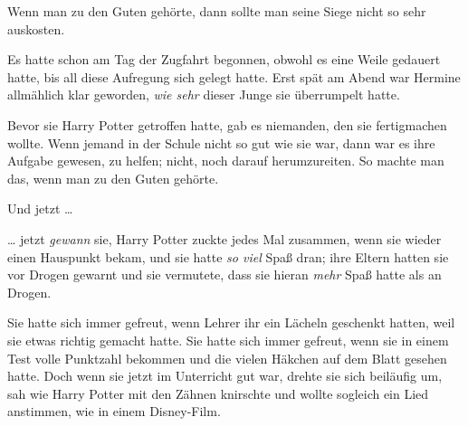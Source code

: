 Wenn man zu den Guten gehörte, dann sollte man seine Siege nicht so sehr auskosten.

Es hatte schon am Tag der Zugfahrt begonnen, obwohl es eine Weile gedauert hatte, bis all diese Aufregung sich gelegt hatte. Erst spät am Abend war Hermine allmählich klar geworden, \emph{wie sehr} dieser Junge sie überrumpelt hatte.

Bevor sie Harry Potter getroffen hatte, gab es niemanden, den sie fertigmachen wollte. Wenn jemand in der Schule nicht so gut wie sie war, dann war es ihre Aufgabe gewesen, zu helfen; nicht, noch darauf herumzureiten. So machte man das, wenn man zu den Guten gehörte.

Und jetzt …

… jetzt \emph{gewann} sie, Harry Potter zuckte jedes Mal zusammen, wenn sie wieder einen Hauspunkt bekam, und sie hatte \emph{so viel} Spaß dran; ihre Eltern hatten sie vor Drogen gewarnt und sie vermutete, dass sie hieran \emph{mehr} Spaß hatte als an Drogen.

Sie hatte sich immer gefreut, wenn Lehrer ihr ein Lächeln geschenkt hatten, weil sie etwas richtig gemacht hatte. Sie hatte sich immer gefreut, wenn sie in einem Test volle Punktzahl bekommen und die vielen Häkchen auf dem Blatt gesehen hatte. Doch wenn sie jetzt im Unterricht gut war, drehte sie sich beiläufig um, sah wie Harry Potter mit den Zähnen knirschte und wollte sogleich ein Lied anstimmen, wie in einem Disney-Film.

